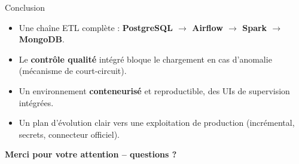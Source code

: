 \documentclass[10pt]{beamer}
\begin{document}
\begin{frame}{Conclusion}
  \begin{itemize}
    \item Une chaîne ETL complète : \textbf{PostgreSQL $\rightarrow$ Airflow
          $\rightarrow$ Spark $\rightarrow$ MongoDB}.
    \item Le \textbf{contrôle qualité} intégré bloque le chargement en cas
          d'anomalie (mécanisme de court-circuit).
    \item Un environnement \textbf{conteneurisé} et reproductible, des UIs de
          supervision intégrées.
    \item Un plan d'évolution clair vers une exploitation de production
          (incrémental, secrets, connecteur officiel).
  \end{itemize}
  \vfill
  \begin{center}
    \textbf{Merci pour votre attention -- questions ?}
  \end{center}
\end{frame}
\end{document}
